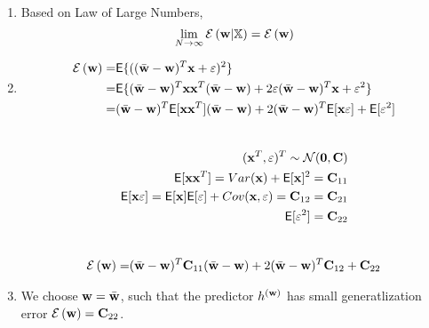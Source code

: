 \documentclass[article,11pt]{article}
\begin{document}
\begin{enumerate}
\item 
Based on Law of Large Numbers,
\begin{equation}
	\lim_{N \to \infty}\mathcal{E} \left( {\bf w} | \mathbb{X}\right) = \mathcal{E} \left( {\bf w} \right)
\end{equation}
\item 
\begin{equation}
 \begin{aligned}
 \mathcal{E} \left( {\bf w} \right)= & 
\mathsf{E} \{ ((\bar{{\bf w}} - {\bf w})^{T} {\bf x}+\varepsilon)^2\} \\
 = &
 \mathsf{E} \{ (\bar{{\bf w}}-{\bf w})^{T}{\bf x} {\bf x}^{T}(\bar{{\bf w}}-{\bf w}) + 2\varepsilon(\bar{{\bf w}}-{\bf w})^{T}{\bf x}+\varepsilon^{2} \} \\
 = & 
  (\bar{{\bf w}}-{\bf w})^{T}\mathsf{E}[{\bf x} {\bf x}^{T}](\bar{{\bf w}}-{\bf w}) + 2(\bar{{\bf w}}-{\bf w})^{T}\mathsf{E}[{\bf x} \varepsilon]+\mathsf{E}[\varepsilon^{2}] 
 \end{aligned}
\end{equation}\\
\begin{equation}
\begin{aligned}
	({\bf x}^{T},\varepsilon)^{T} \sim \mathcal{N}(\mathbf{0},\mathbf{C}) \\
\mathsf{E}[{\bf x} {\bf x}^{T}]= Var({\bf x})+\mathsf{E}[{\bf x}]^{2} =  \mathbf{C}_{11} \\
\mathsf{E}[{\bf x} \varepsilon]=\mathsf{E}[{\bf x}] \mathsf{E}[\varepsilon]+Cov({\bf x},\varepsilon) = \mathbf{C}_{12}=\mathbf{C}_{21} \\
\mathsf{E}[\varepsilon^{2}] =\mathbf{C}_{22}
\end{aligned}
\end{equation}\\
\begin{equation}
\begin{aligned}
\mathcal{E} \left( {\bf w} \right)
= & 
(\bar{{\bf w}}-{\bf w})^{T}\mathbf{C}_{11}(\bar{{\bf w}}-{\bf w}) + 2(\bar{{\bf w}}-{\bf w})^{T}\mathbf{C}_{12}+\mathbf{C}_{22} \\
\end{aligned}
\end{equation}

\item 
We choose ${\bf w} = \bar{{\bf w}}$, such that the predictor $h^{({\bf w})}$ has small generatlization error $\mathcal{E} \left( {\bf w} \right) = \mathbf{C}_{22}$.
\end{enumerate}
\newpage
\end{document}
